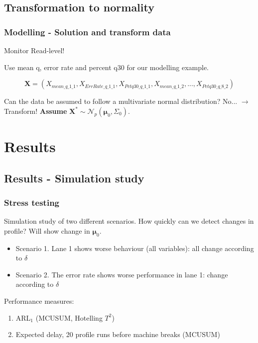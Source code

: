 \documentclass[10pt]{beamer}\usepackage[]{graphicx}\usepackage[]{color}
\begin{document}
\subsection{Transformation to normality}
\begin{frame}\frametitle{Modelling - Solution and transform data}

Monitor Read-level! 

Use mean q, error rate and percent q30 for our modelling example.

$$
\mathbf{X} = (X_{mean\_ q\_ 1\_ 1},X_{ErrRate\_ q\_ 1\_ 1},X_{Pctq30\_ q\_ 1\_ 1},X_{mean\_ q\_ 1\_ 2},..., X_{Pctq30\_ q\_ 8\_ 2})
$$

Can the data be assumed to follow a multivariate normal distribution? No... $\rightarrow$ Transform! \textbf{Assume} $\mathbf{X}^*\sim \mathcal{N}_p(\boldsymbol{\mu}_0,\Sigma_0)$.
\end{frame}
 
%  

\section{Results}
\subsection{Results - Simulation study}
 
\begin{frame}\frametitle{Stress testing}
Simulation study of two different scenarios. How quickly can we detect changes in profile? Will show change in $\boldsymbol{\mu}_0$. 
 \begin{itemize}
 \item Scenario 1. Lane 1 shows worse behaviour (all variables): all change according to $\delta$
 \item Scenario 2. The error rate shows worse performance in lane 1: change according to $\delta$
 \end{itemize}
 \pause
 Performance measures:
 \begin{enumerate}
 \item ARL$_1$ (MCUSUM, Hotelling $T^2$)
 \item Expected delay, 20 profile runs before machine breaks (MCUSUM)
 \end{enumerate}
\end{frame}
\end{document}
